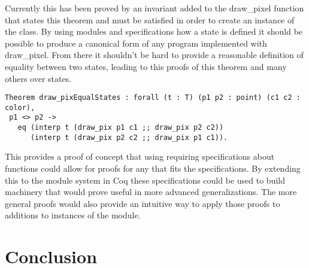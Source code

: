 \documentclass{llncs}
\begin{document}
Currently this has been proved by an invariant added to the draw\_pixel function that states this theorem and must be satisfied in order to create an instance of the class.  By using modules and specifications how a state is defined it should be possible to produce a canonical form of any program implemented with draw\_pixel.  From there it shouldn't be hard to provide a reasonable definition of equality between two states, leading to this proofs of this theorem and many others over states.

\begin{lstlisting}
Theorem draw_pixEqualStates : forall (t : T) (p1 p2 : point) (c1 c2 : color),
 p1 <> p2 -> 
   eq (interp t (draw_pix p1 c1 ;; draw_pix p2 c2))
      (interp t (draw_pix p2 c2 ;; draw_pix p1 c1)).
\end{lstlisting}

This provides a proof of concept that using requiring specifications about functions could allow for proofs for any that fits the specifications.
By extending this to the module system in Coq these specifications could be used to build machinery that would prove useful in more advanced generalizations.  The more general proofs would also provide an intuitive way to apply those proofs to additions to instances of the module.


\section{Conclusion}






\end{document}
